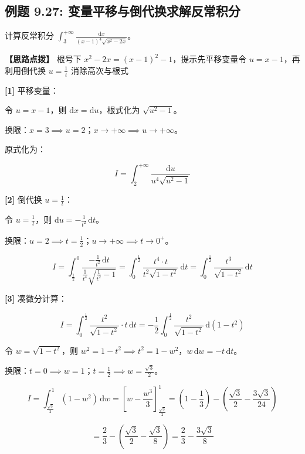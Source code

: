 \documentclass[11pt,a4paper,UTF8]{ctexart}
\begin{document}
\subsection{例题 9.27: 变量平移与倒代换求解反常积分}

计算反常积分 $\int_3^{+\infty} \frac{\mathrm{d}x}{(x-1)^4\sqrt{x^2-2x}}$。

\textbf{\color{DeepPurple}【思路点拨】} 根号下 $x^2-2x = (x-1)^2 - 1$，提示先平移变量令 $u = x-1$，再利用倒代换 $u = \frac{1}{t}$ 消除高次与根式


\begin{solbox}[分步推导与答题规范]
\textbf{[1]} 平移变量：

令 $u = x-1$，则 $\mathrm{d}x = \mathrm{d}u$，根式化为 $\sqrt{u^2-1}$。

换限：$x=3 \implies u=2$；$x \to +\infty \implies u \to +\infty$。

原式化为：


\begin{equation*}
I = \int_2^{+\infty} \frac{\mathrm{d}u}{u^4\sqrt{u^2-1}}
\end{equation*}


\textbf{[2]} 倒代换 $u = \frac{1}{t}$：

令 $u = \frac{1}{t}$，则 $\mathrm{d}u = -\frac{1}{t^2}\,\mathrm{d}t$。

换限：$u=2 \implies t=\frac{1}{2}$；$u \to +\infty \implies t \to 0^+$。


\begin{equation*}
I = \int_{\frac{1}{2}}^0 \frac{-\frac{1}{t^2}\,\mathrm{d}t}{\frac{1}{t^4}\sqrt{\frac{1}{t^2}-1}} = \int_0^{\frac{1}{2}} \frac{t^4 \cdot t}{t^2 \sqrt{1-t^2}}\,\mathrm{d}t = \int_0^{\frac{1}{2}} \frac{t^3}{\sqrt{1-t^2}}\,\mathrm{d}t
\end{equation*}


\textbf{[3]} 凑微分计算：


\begin{equation*}
I = \int_0^{\frac{1}{2}} \frac{t^2}{\sqrt{1-t^2}} \cdot t\,\mathrm{d}t = -\frac{1}{2}\int_0^{\frac{1}{2}} \frac{t^2}{\sqrt{1-t^2}}\,\mathrm{d}(1-t^2)
\end{equation*}


令 $w = \sqrt{1-t^2}$，则 $w^2 = 1-t^2 \implies t^2 = 1-w^2$，$w\,\mathrm{d}w = -t\,\mathrm{d}t$。

换限：$t=0 \implies w=1$；$t=\frac{1}{2} \implies w=\frac{\sqrt{3}}{2}$。


\begin{equation*}
I = \int_{\frac{\sqrt{3}}{2}}^1 (1-w^2)\,\mathrm{d}w = \left[ w - \frac{w^3}{3} \right]_{\frac{\sqrt{3}}{2}}^1 = \left(1 - \frac{1}{3}\right) - \left(\frac{\sqrt{3}}{2} - \frac{3\sqrt{3}}{24}\right)
\end{equation*}



\begin{equation*}
= \frac{2}{3} - \left(\frac{\sqrt{3}}{2} - \frac{\sqrt{3}}{8}\right) = \frac{2}{3} - \frac{3\sqrt{3}}{8}
\end{equation*}

\end{solbox}
\end{document}
